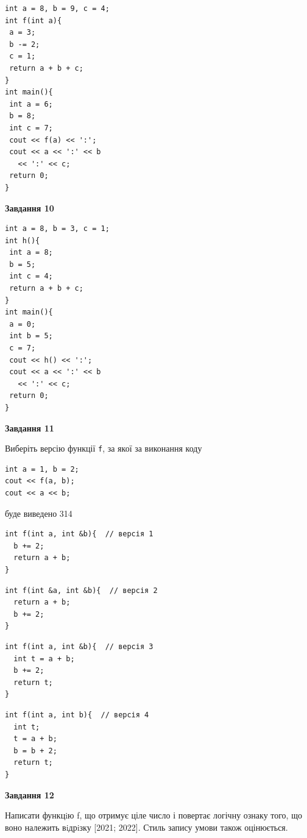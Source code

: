 \documentclass[12pt, ukrainian]{article}
\def\code#1{\Verb!#1!}
\begin{document}
{\begin {large}
\begin{minipage}[t]{7.0cm}
\begin{verbatim}
int a = 8, b = 9, c = 4;
int f(int a){
 a = 3;
 b -= 2;
 c = 1;
 return a + b + c;
}
int main(){
 int a = 6;
 b = 8;
 int c = 7;
 cout << f(a) << ':';
 cout << a << ':' << b 
   << ':' << c;
 return 0;
}
\end{verbatim}



\begin{center}
\textbf{Завдання 10}
\end{center}
\vspace{-8mm}

\begin{verbatim}
int a = 8, b = 3, c = 1;
int h(){
 int a = 8;
 b = 5;
 int c = 4;
 return a + b + c;
}
int main(){
 a = 0;
 int b = 5;
 c = 7;
 cout << h() << ':';
 cout << a << ':' << b 
   << ':' << c;
 return 0;
}
\end{verbatim}

\end{minipage}
\vline \hspace{1mm}
\begin{minipage}[t]{11.0cm}

\begin{center}
\textbf{Завдання 11}
\end{center}
Виберіть версію функції \code{f}, за якої за виконання коду
\begin{verbatim}
int a = 1, b = 2;
cout << f(a, b);
cout << a << b;
\end{verbatim}

буде виведено 314

\begin{verbatim}
int f(int a, int &b){  // версія 1
  b += 2;
  return a + b;
}
\end{verbatim}

\vspace{-8mm}\begin{verbatim}
int f(int &a, int &b){  // версія 2
  return a + b;
  b += 2;
}
\end{verbatim}

\vspace{-8mm}\begin{verbatim}
int f(int a, int &b){  // версія 3
  int t = a + b;
  b += 2;
  return t;
}
\end{verbatim}

\vspace{-8mm}\begin{verbatim}
int f(int a, int b){  // версія 4
  int t;
  t = a + b;
  b = b + 2;
  return t;
}
\end{verbatim}



\begin{center}
\textbf{Завдання 12}
\end{center}

Написати функцiю f, що отримує ціле число і повертає логічну ознаку того, що воно належить вiдрiзку [2021; 2022]. Стиль запису умови також оцінюється.\par

\end{minipage}

\end {large}}
\end{document}
